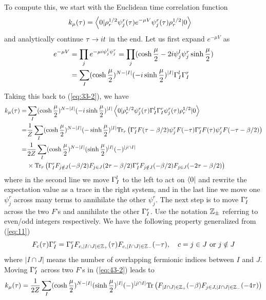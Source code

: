 \documentclass[11pt]{article}
\renewcommand{\>}{\rangle}
\newcommand{\<}{\langle}
\begin{document}
To compute this, we start with the Euclidean time correlation function
\begin{align}
k_{\mu}(\tau) & =\left\langle 0|\rho_{r}^{1/2}\psi_{j}^{r}(\tau)e^{-\mu V}\psi_{j}^{r}(\tau)\rho_{r}^{1/2}|0\right\rangle\label{eq:33-2}
\end{align}
and analytically continue $\tau\rightarrow it$ in the end. Let us first expand
$e^{-\mu V}$ as 
\begin{align}
e^{-\mu V} & =\prod_{j}e^{-\mu i\psi_{j}^{l}\psi_{j}^{r}}=\prod_{j}(\cosh\frac{\mu}{2}-2i\psi_{j}^{l}\psi_{j}^{r}\sinh\frac{\mu}{2})\nonumber \\
 & =\sum_{I}(\cosh\frac{\mu}{2})^{N-|I|}(-i\sinh\frac{\mu}{2})^{|I|}\Gamma_{I}^{l}\Gamma_{I}^{r}\label{eq:35}
\end{align}
Taking this back to (\ref{eq:33-2}), we have
\begin{align}
k_{\mu}(\tau)= & \sum_{I}(\cosh\frac{\mu}{2})^{N-|I|}(-i\sinh\frac{\mu}{2})^{|I|}\left\langle 0|\rho_{r}^{1/2}\psi_{j}^{r}(\tau)\Gamma_{I}^{l}\Gamma_{I}^{r}\psi_{j}^{r}(\tau)\rho_{r}^{1/2}|0\right\rangle\nonumber \\
= & \frac{1}{Z}\sum_{I}(\cosh\frac{\mu}{2})^{N-|I|}(-\sinh\frac{\mu}{2})^{|I|}\text{Tr}_{r}\left(\Gamma_{I}^{r}F(\tau-\beta/2)\psi_{j}^{r}F(-\tau)\Gamma_{I}^{r}F(\tau)\psi_{j}^{r}F(-\tau-\beta/2)\right)\nonumber \\
= & \frac{1}{2Z}\sum_{I}(\cosh\frac{\mu}{2})^{N-|I|}(\sinh\frac{\mu}{2})^{|I|}(-)^{|j\cap I|}\nonumber \\
 & \times\text{Tr}_{r}\left(\Gamma_{I}^{r}F_{j\notin J}(-\beta/2)F_{j\in J}(2\tau-\beta/2)\Gamma_{I}^{r}F_{j\notin J}(-\beta/2)F_{j\in J}(-2\tau-\beta/2)\right)\label{eq:43-2}
\end{align}
where in the second line we move $\Gamma_{I}^{l}$ to the left to act
on $\left\langle 0\right|$ and rewrite the expectation value as a trace in the right
system, and in the last line we move one $\psi_{j}^{r}$ across many
terms to annihilate the other $\psi_{j}^{r}$. The next step is to
move $\Gamma_{I}^{r}$ across the two $F$'s and annihilate the other
$\Gamma_{I}^{r}$. Use the notation $\mathbb{Z}_{\pm}$ referring to even/odd
integers respectively. We have the following property generalized
from (\ref{eq:11})
\begin{equation}
F_{c}(\tau)\Gamma_{I}^{r}=\Gamma_{I}^{r}F_{c,|I\cap J|\in\mathbb{Z}_{+}}(\tau)F_{c,|I\cap J|\in\mathbb{Z}_{-}}(-\tau),\quad c=j\in J\text{ or }j\notin J\label{eq:37}
\end{equation}
where $|I\cap J|$ means the number of overlapping fermionic indices
between $I$ and $J$. Moving $\Gamma_{I}^{r}$ across two $F$'s in (\ref{eq:43-2})
leads to
\begin{equation}
k_{\mu}(\tau)=\frac{1}{2Z}\sum_{I}(\cosh\frac{\mu}{2})^{N-|I|}(\sinh\frac{\mu}{2})^{|I|}(-)^{|j\cap I|}\text{Tr}\left(F_{|I\cap J|\in\mathbb{Z}_{+}}(-\beta)F_{j\in J,|I\cap J|\in\mathbb{Z}_{-}}(-4\tau)\right)
\end{equation}
\end{document}
